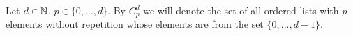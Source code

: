 \begin{notation}
  Let
    $d \in \mathbb{N}$,
    $p \in \{0, ..., d\}$.
  By $C^d_p$ we will denote the set of all ordered lists with $p$ elements
  without repetition whose elements are from the set $\{0, ..., d - 1\}$.
\end{notation}
